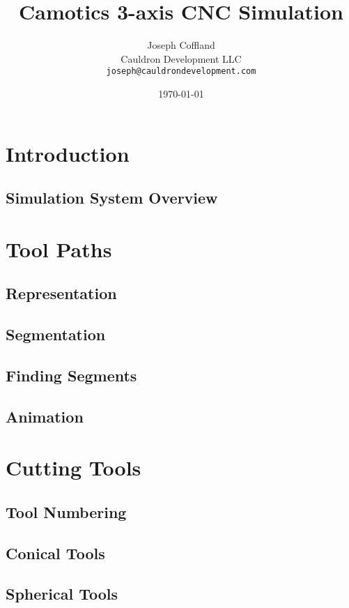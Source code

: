 \documentclass{report}
\begin{document}
\title{Camotics 3-axis CNC Simulation}
\date{\today}
\author{
  Joseph Coffland\\
  Cauldron Development LLC\\
  \texttt{joseph@cauldrondevelopment.com}
}
\maketitle


\tableofcontents

\chapter{Introduction}
\section{Simulation System Overview}

\chapter{Tool Paths}
\section{Representation}
\section{Segmentation}
\section{Finding Segments}
\section{Animation}

\chapter{Cutting Tools}
\section{Tool Numbering}
\section{Conical Tools}
\section{Spherical Tools}
\end{document}
